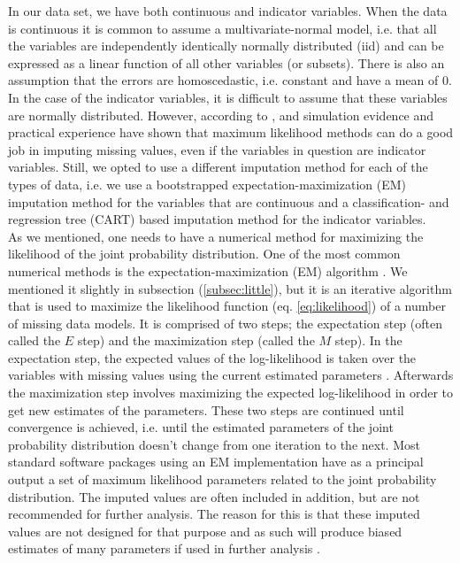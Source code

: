\documentclass[../thesis.tex]{subfiles}
\begin{document}
\indent In our data set, we have both continuous and indicator variables. When the data is continuous it is common to assume a multivariate-normal model, i.e. that all the variables are independently identically normally distributed (iid) and can be expressed as a linear function of all other variables (or subsets). There is also an assumption that the errors are homoscedastic, i.e. constant and have a mean of 0. In the case of the indicator variables, it is difficult to assume that these variables are normally distributed. However, according to \cite{schafer1997analysis}, \cite{schafer1998multiple} and \cite{allison1999missing} simulation evidence and practical experience have shown that maximum likelihood methods can do a good job in imputing missing values, even if the variables in question are indicator variables. Still, we opted to use a different imputation method for each of the types of data, i.e. we use a bootstrapped expectation-maximization (EM) imputation method for the variables that are continuous and a classification- and regression tree (CART) based imputation method for the indicator variables.\\
\indent As we mentioned, one needs to have a numerical method for maximizing the likelihood of the joint probability distribution. One of the most common numerical methods is the expectation-maximization (EM) algorithm \citep{dempster1977maximum}. We mentioned it slightly in subsection (\ref{subsec:little}), but it is an iterative algorithm that is used to maximize the likelihood function (eq. \ref{eq:likelihood}) of a number of missing data models. It is comprised of two steps; the expectation step (often called the $E$ step) and the maximization step (called the $M$ step). In the expectation step, the expected values of the log-likelihood is taken over the variables with missing values using the current estimated parameters \citep{allison1999missing}. Afterwards the maximization step involves maximizing the expected log-likelihood in order to get new estimates of the parameters. These two steps are continued until convergence is achieved, i.e. until the estimated parameters of the joint probability distribution doesn't change from one iteration to the next. Most standard software packages using an EM implementation have as a principal output a set of maximum likelihood parameters related to the joint probability distribution. The imputed values are often included in addition, but are not recommended for further analysis. The reason for this is that these imputed values are not designed for that purpose and as such will produce biased estimates of many parameters if used in further analysis \citep{allison1999missing}.\\
\end{document}
